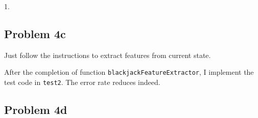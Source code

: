 \documentclass[paper=a4, fontsize=10pt]{scrartcl} %
\numberwithin{equation}{section} %
\numberwithin{figure}{section} %
\numberwithin{table}{section} %
\begin{document}
\begin{spacing}{1.}
\subsection{Problem 4c}
Just follow the instructions to extract features from current state.

After the completion of function \texttt{blackjackFeatureExtractor}, I implement the test code in \texttt{test2}. The error rate reduces indeed.

\subsection{Problem 4d}









\end{spacing}
\end{document}
